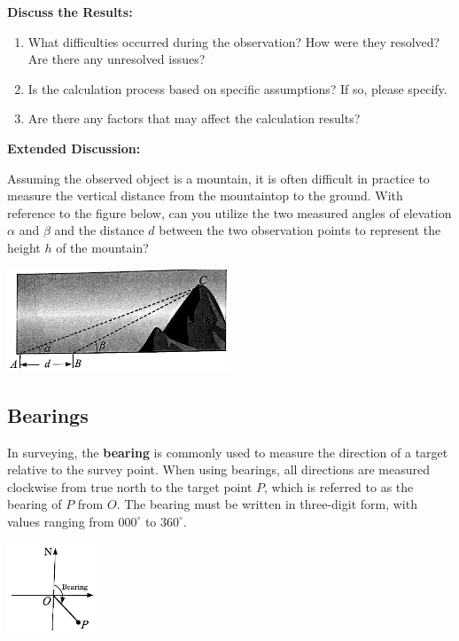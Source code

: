 \documentclass{report}
\begin{document}
\begin{explore}
    \noindent\textbf{Discuss the Results:} 
    \vspace{-1em}
    \begin{enumerate}[leftmargin=*]
        \item  What difficulties occurred during the observation? How were they resolved? Are there any unresolved issues?

        \item Is the calculation process based on specific assumptions? If so, please specify.

        \item Are there any factors that may affect the calculation results?
    \end{enumerate}

    \noindent \textbf{Extended Discussion:}

    \noindent Assuming the observed object is a mountain, it is often difficult in practice to measure the vertical distance from the mountaintop to the ground. With reference to the figure below, can you utilize the two measured angles of elevation $\alpha$ and $\beta$ and the distance $d$ between the two observation points to represent the height $h$ of the mountain?
    \begin{center}
        \includegraphics[width=0.5\textwidth]{assets/10-63.jpg}
    \end{center}
    \end{explore}

    \newpage

    \subsection*{Bearings}

    \begin{vwcol}[widths={0.7,0.3}, sep=8mm, rule=0pt]
        In surveying, the \textbf{bearing} is commonly used to measure the direction of a target relative to the survey point. When using bearings, all directions are measured clockwise from true north to the target point $P$, which is referred to as the bearing of $P$ from $O$. The bearing must be written in three-digit form, with values ranging from $000^\circ$ to $360^\circ$.

        \includegraphics[width=0.2\textwidth]{assets/10-64.jpg}
    \end{vwcol}
\end{document}
